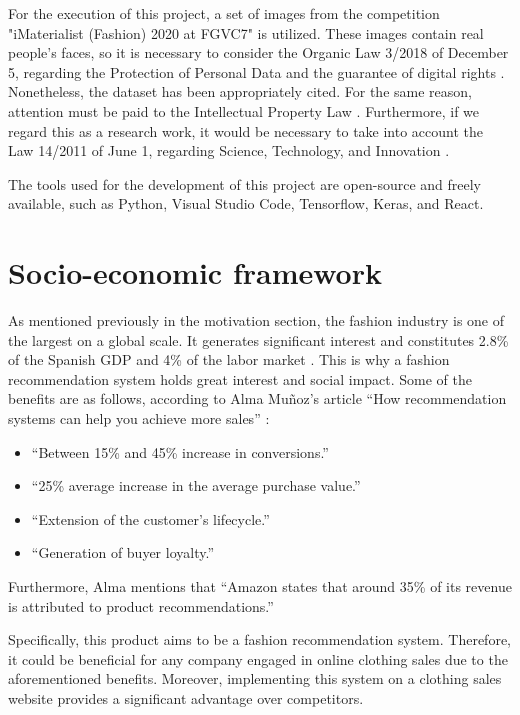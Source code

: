 \documentclass[12pt]{report} %
\begin{document}
For the execution of this project, a set of images from the competition "iMaterialist (Fashion) 2020 at FGVC7" \cite{imaterialist} is utilized. These images contain real people's faces, so it is necessary to consider the Organic Law 3/2018 of December 5, regarding the Protection of Personal Data and the guarantee of digital rights \cite{ley-proteccion-datos}. Nonetheless, the dataset has been appropriately cited. For the same reason, attention must be paid to the Intellectual Property Law \cite{ley-propiedad-intelectual}. Furthermore, if we regard this as a research work, it would be necessary to take into account the Law 14/2011 of June 1, regarding Science, Technology, and Innovation \cite{ley-tecnologia}.

The tools used for the development of this project are open-source and freely available, such as Python, Visual Studio Code, Tensorflow, Keras, and React.

\section*{Socio-economic framework}

As mentioned previously in the motivation section, the fashion industry is one of the largest on a global scale. It generates significant interest and constitutes 2.8\% of the Spanish GDP and 4\% of the labor market \cite{estadisticas-moda}. This is why a fashion recommendation system holds great interest and social impact. Some of the benefits are as follows, according to Alma Muñoz's article ``How recommendation systems can help you achieve more sales'' \cite{alma}:
\begin{itemize}
	\item ``Between 15\% and 45\% increase in conversions.''
	\item ``25\% average increase in the average purchase value.''
	\item ``Extension of the customer's lifecycle.''
	\item ``Generation of buyer loyalty.''
\end{itemize}

Furthermore, Alma mentions that ``Amazon states that around 35\% of its revenue is attributed to product recommendations.''

Specifically, this product aims to be a fashion recommendation system. Therefore, it could be beneficial for any company engaged in online clothing sales due to the aforementioned benefits. Moreover, implementing this system on a clothing sales website provides a significant advantage over competitors.
\end{document}
